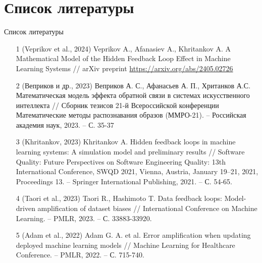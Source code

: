 \documentclass[aspectratio=169]{beamer}
\begin{document}
\section{Список литературы}
    \begin{frame}{Список литературы}
        \scriptsize

        \begin{enumerate}
            \item[1] \textcolor{myNewColorA}{(Veprikov et al., 2024)} Veprikov A.,   Afanasiev A., Khritankov A. A Mathematical Model of the Hidden Feedback Loop Effect in Machine Learning Systems // arXiv preprint \url{https://arxiv.org/abs/2405.02726}
            
            \item[2] \textcolor{myNewColorA}{(Веприков и др., 2023)} Веприков А. С., Афанасьев А. П., Хританков А.С. Математическая модель эффекта обратной связи в системах искусственного интеллекта // Сборник тезисов 21-й Всероссийской конференции Математические методы распознавания образов (ММРО-21). – Российская академия наук, 2023. – С. 35-37 
            
            \item[3] \textcolor{myNewColorA}{(Khritankov, 2023)} Khritankov A. Hidden feedback loops in machine learning systems: A simulation model and preliminary results // Software Quality: Future Perspectives on Software Engineering Quality: 13th International Conference, SWQD 2021, Vienna, Austria, January 19–21, 2021, Proceedings 13. – Springer International Publishing, 2021. – С. 54-65.

            
            \item[4] \textcolor{myNewColorA}{(Taori et al., 2023)} Taori R., Hashimoto T. Data feedback loops: Model-driven amplification of dataset biases // International Conference on Machine Learning. – PMLR, 2023. – С. 33883-33920.
            
            \item[5] \textcolor{myNewColorA}{(Adam et al., 2022)} Adam G. A. et al. Error amplification when updating deployed machine learning models // Machine Learning for Healthcare Conference. – PMLR, 2022. – С. 715-740.


\end{enumerate}
\end{frame}
\end{document}
